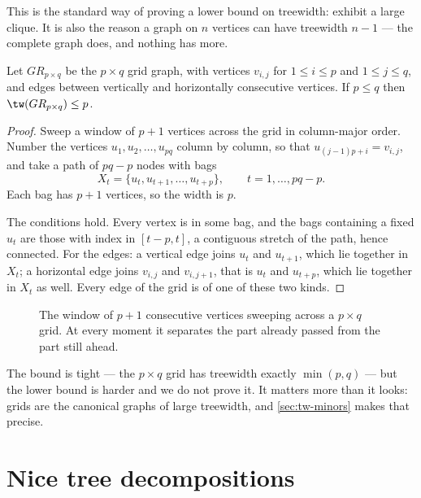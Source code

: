 This is the standard way of proving a lower bound on treewidth: exhibit a large
clique. It is also the reason a graph on $n$ vertices can have treewidth
$n-1$ --- the complete graph does, and nothing has more.

\begin{proposition}[Grids]\label{prop:tw-grid}
Let $GR_{p \times q}$ be the $p \times q$ grid graph, with vertices $v_{i,j}$
for $1 \le i \le p$ and $1 \le j \le q$, and edges between vertically and
horizontally consecutive vertices. If $p \le q$ then
$\tw(GR_{p \times q}) \le p$.
\end{proposition}

\begin{proof}
Sweep a window of $p+1$ vertices across the grid in column-major order. Number
the vertices $u_1, u_2, \ldots, u_{pq}$ column by column, so that
$u_{(j-1)p + i} = v_{i,j}$, and take a path of $pq - p$ nodes with bags
\[ X_t = \{u_t, u_{t+1}, \ldots, u_{t+p}\}, \qquad t = 1, \ldots, pq-p. \]
Each bag has $p+1$ vertices, so the width is $p$.

The conditions hold. Every vertex is in some bag, and the bags containing a
fixed $u_t$ are those with index in $[t-p, t]$, a contiguous stretch of the
path, hence connected. For the edges: a vertical edge joins $u_t$ and $u_{t+1}$,
which lie together in $X_t$; a horizontal edge joins $v_{i,j}$ and $v_{i,j+1}$,
that is $u_t$ and $u_{t+p}$, which lie together in $X_t$ as well. Every edge of
the grid is of one of these two kinds.
\end{proof}

\begin{figure}[ht]
\centering
{}
\caption{The window of $p+1$ consecutive vertices sweeping across a $p \times q$
grid. At every moment it separates the part already passed from the part still
ahead.}
\label{fig:tw-grid}
\end{figure}

The bound is tight --- the $p \times q$ grid has treewidth exactly $\min(p,q)$
--- but the lower bound is harder and we do not prove it. It matters more than
it looks: grids are the canonical graphs of large treewidth, and
\cref{sec:tw-minors} makes that precise.

\section{Nice tree decompositions}
\label{sec:nice-decompositions}


